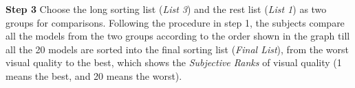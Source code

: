 \textbf{Step 3} Choose the long sorting list (\textit{List 3}) and the rest list (\textit{List 1}) as two groups for comparisons. Following the procedure in step 1, the subjects compare all the models from the two groups according to the order shown in the graph till all the 20 models are sorted into the final sorting list (\textit{Final List}), from the worst visual quality to the best, which shows the \textit{Subjective Ranks} of visual quality (1 means the best, and 20 means the worst).